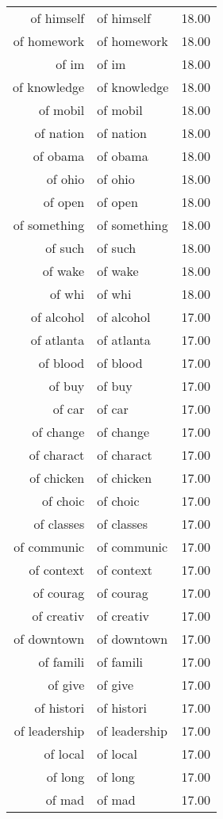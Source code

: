 \begin{table}[ht]
\begin{tabular}{rlr}
  of himself & of himself & 18.00 \\ 
  of homework & of homework & 18.00 \\ 
  of im & of im & 18.00 \\ 
  of knowledge & of knowledge & 18.00 \\ 
  of mobil & of mobil & 18.00 \\ 
  of nation & of nation & 18.00 \\ 
  of obama & of obama & 18.00 \\ 
  of ohio & of ohio & 18.00 \\ 
  of open & of open & 18.00 \\ 
  of something & of something & 18.00 \\ 
  of such & of such & 18.00 \\ 
  of wake & of wake & 18.00 \\ 
  of whi & of whi & 18.00 \\ 
  of alcohol & of alcohol & 17.00 \\ 
  of atlanta & of atlanta & 17.00 \\ 
  of blood & of blood & 17.00 \\ 
  of buy & of buy & 17.00 \\ 
  of car & of car & 17.00 \\ 
  of change & of change & 17.00 \\ 
  of charact & of charact & 17.00 \\ 
  of chicken & of chicken & 17.00 \\ 
  of choic & of choic & 17.00 \\ 
  of classes & of classes & 17.00 \\ 
  of communic & of communic & 17.00 \\ 
  of context & of context & 17.00 \\ 
  of courag & of courag & 17.00 \\ 
  of creativ & of creativ & 17.00 \\ 
  of downtown & of downtown & 17.00 \\ 
  of famili & of famili & 17.00 \\ 
  of give & of give & 17.00 \\ 
  of histori & of histori & 17.00 \\ 
  of leadership & of leadership & 17.00 \\ 
  of local & of local & 17.00 \\ 
  of long & of long & 17.00 \\ 
  of mad & of mad & 17.00 \\ 

\end{tabular}
\end{table}
